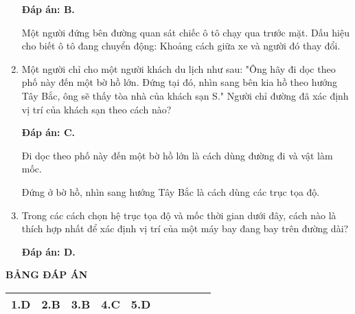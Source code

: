 \begin{enumerate}[label=\bfseries Câu \arabic*:]
	\loigiai
	{\textbf{Đáp án: B.}
		
		Một người đứng bên đường quan sát chiếc ô tô chạy qua trước mặt. Dấu hiệu cho biết ô tô đang chuyển động: Khoảng cách giữa xe và người đó thay đổi. 
		
		
	}
	\item {}
	
	\cauhoi
	{Một người chỉ cho một người khách du lịch như sau: "Ông hãy đi dọc theo phố này đến một bờ hồ lớn. Đứng tại đó, nhìn sang bên kia hồ theo hướng Tây Bắc, ông sẽ thấy tòa nhà của khách sạn S." Người chỉ đường đã xác định vị trí của khách sạn theo cách nào?
	}
	
	\loigiai
	{\textbf{Đáp án: C.}
		
		Đi dọc theo phố này đến một bờ hồ lớn là cách dùng đường đi và vật làm mốc.
		
		Đứng ở bờ hồ, nhìn sang hướng Tây Bắc là cách dùng các trục tọa độ.
		
		
	}
	\item {}
	
	\cauhoi
	{Trong các cách chọn hệ trục tọa độ và mốc thời gian dưới đây, cách nào là thích hợp nhất để xác định vị trí của một máy bay đang bay trên đường dài?
	}
	
	\loigiai
	{\textbf{Đáp án: D.}		
		
	}
	
\end{enumerate}

\whiteBGstarEnd

\loigiai
{
	\begin{center}
		\textbf{BẢNG ĐÁP ÁN}
	\end{center}
	\begin{center}
		\begin{tabular}{|m{2.8em}|m{2.8em}|m{2.8em}|m{2.8em}|m{2.8em}|m{2.8em}|m{2.8em}|m{2.8em}|m{2.8em}|m{2.8em}|}
			\hline
			1.D  & 2.B  & 3.B  & 4.C  & 5.D  &   &  &  &  &  \\
			\hline
			
		\end{tabular}
	\end{center}
}